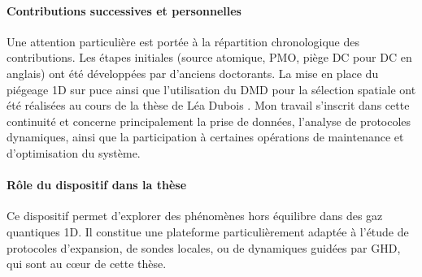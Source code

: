 \paragraph{Contributions successives et personnelles}  
Une attention particulière est portée à la répartition chronologique des contributions. Les étapes initiales (source atomique, \gls{PMO}, piège \acrshort{DC} pour \acrlong{DC} en anglais) ont été développées par d’anciens doctorants. La mise en place du piégeage 1D sur puce ainsi que l’utilisation du \gls{DMD} pour la sélection spatiale ont été réalisées au cours de la thèse de Léa Dubois \cite{L.Dubois2024}. Mon travail s’inscrit dans cette continuité et concerne principalement la prise de données, l’analyse de protocoles dynamiques, ainsi que la participation à certaines opérations de maintenance et d’optimisation du système.

\paragraph{Rôle du dispositif dans la thèse}  
Ce dispositif permet d’explorer des phénomènes hors équilibre dans des gaz quantiques 1D. Il constitue une plateforme particulièrement adaptée à l’étude de protocoles d’expansion, de sondes locales, ou de dynamiques guidées par \gls{GHD}, qui sont au cœur de cette thèse.




%

